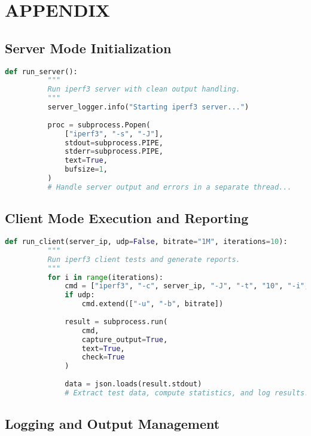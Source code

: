 
\section{APPENDIX} \label{sec:appendix}

    \subsection*{Server Mode Initialization}

        \begin{lstlisting}[language=Python, caption={Excerpt for server mode initialization.}]
      def run_server():
          """
          Run iperf3 server with clean output handling.
          """
          server_logger.info("Starting iperf3 server...")
          
          proc = subprocess.Popen(
              ["iperf3", "-s", "-J"],
              stdout=subprocess.PIPE,
              stderr=subprocess.PIPE,
              text=True,
              bufsize=1,
          )
          # Handle server output and errors in a separate thread...
        \end{lstlisting}

    \subsection*{Client Mode Execution and Reporting}

        \begin{lstlisting}[language=Python, caption={Excerpt for client mode execution.}]
      def run_client(server_ip, udp=False, bitrate="1M", iterations=10):
          """
          Run iperf3 client tests and generate reports.
          """
          for i in range(iterations):
              cmd = ["iperf3", "-c", server_ip, "-J", "-t", "10", "-i", "1"]
              if udp:
                  cmd.extend(["-u", "-b", bitrate])
              
              result = subprocess.run(
                  cmd,
                  capture_output=True,
                  text=True,
                  check=True
              )
              
              data = json.loads(result.stdout)
              # Extract test data, compute statistics, and log results...
        \end{lstlisting}

    \subsection*{Logging and Output Management}

